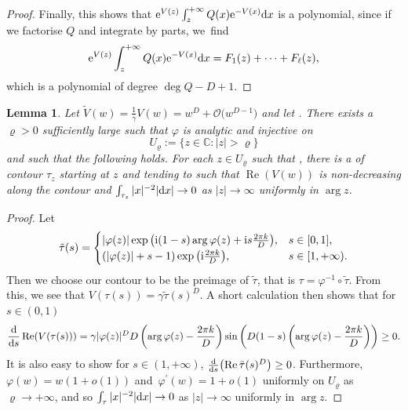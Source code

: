 \documentclass[pdftex]{sigma}
\numberwithin{equation}{section}
\newtheorem{Lemma}[Theorem]{Lemma}
\begin{document}
\begin{proof}
Finally, this shows that ${\rm e}^{V(z)} \int_z^{+\infty} Q(x) {\rm e}^{-V(x)} {\rm d}x$ is a polynomial, since if we factorise $Q$ and integrate by parts, we~find
\begin{equation*}
{\rm e}^{V(z)} \int_z^{+\infty} Q(x) {\rm e}^{-V(x)} {\rm d}x = F_1(z) + \dots + F_\ell(z),
\end{equation*}
which is a polynomial of degree $\deg Q - D + 1$.
\end{proof}

\begin{Lemma}\label{contour} Let $\tilde{V}(w) = \frac{1}{\gamma}V(w) = w^D + \mathcal{O}\big(w^{D-1}\big)$ and let . There exists a~${\varrho > 0}$ sufficiently large such that $\varphi$ is analytic and injective on
\begin{equation*}
U_\varrho := \{ z \in \mathbb{C}\colon |z| > \varrho \}
\end{equation*}
and such that the following holds. For each $z \in U_\varrho$ such that
,
there is a of contour $\tau_z$ starting at $z$ and tending to  such that $\operatorname{Re} (V(w))$ is non-decreasing along the contour and $\int_{\tau_z}|x|^{-2} |{\rm d}x| \to 0$ as $|z| \to \infty$ uniformly in $\operatorname{arg} z$.
\end{Lemma}
\begin{proof}
Let
\begin{equation*}
\tilde{\tau} (s) =
\begin{cases}
 |\varphi(z)| \exp\big({\rm i} (1-s)\arg \varphi(z) + {\rm i}s\frac{2\pi k}{D} \big), & s \in [0,1] ,\\
 (|\varphi(z)|+s-1) \exp\big({\rm i} \frac{2\pi k}{D} \big), & s \in [1,+\infty). \\
\end{cases}
\end{equation*}
Then we choose our contour to be the preimage of $\tilde{\tau}$, that is $\tau= \varphi^{-1} \circ \tilde{\tau}$. From this, we see that $V(\tau(s)) = \gamma \tilde{\tau}(s)^D$. A short calculation then shows that for $s \in (0,1)$
\begin{equation*}
\frac{\rm d}{{\rm d}s} \operatorname{Re} (V(\tau(s))) = \gamma |\varphi(z)|^D D \left( \arg \varphi(z) - \frac{2\pi k}{D} \right) \sin\left( D (1-s) \left( \arg \varphi(z) - \frac{2\pi k}{D} \right) \right) \geq 0.
\end{equation*}
It is also easy to show for $s \in (1,+\infty)$, $\frac{\rm d}{{\rm d}s} \bigl(\operatorname{Re} \tilde{\tau}(s)^D\bigr) \geq 0$. Furthermore, $\varphi(w) = w (1+o(1))$ and~${\varphi^\prime(w) = 1+o(1)}$ uniformly on $U_\varrho$ as $\varrho \to +\infty$, and so $\int_\tau |x|^{-2} |{\rm d}x| \to 0$ as $|z| \to \infty$ uniformly in $\operatorname{arg} z$.
\end{proof}
\end{document}
